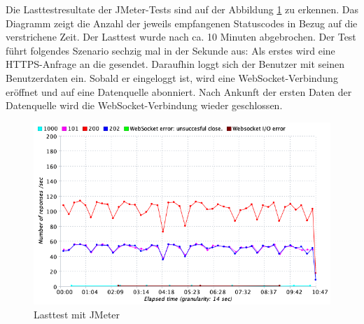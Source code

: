 Die Lasttestresultate der JMeter-Tests sind auf der Abbildung \ref{figure:lasttestmitjmeter}
zu erkennen. Das Diagramm zeigt die Anzahl der jeweils empfangenen Statuscodes in Bezug
auf die verstrichene Zeit. Der Lasttest wurde nach ca. 10 Minuten abgebrochen.
Der Test führt folgendes Szenario sechzig mal in der Sekunde aus:
Als erstes wird eine HTTPS-Anfrage an die  gesendet.
Daraufhin loggt sich der Benutzer mit seinen Benutzerdaten ein.
Sobald er eingeloggt ist, wird eine WebSocket-Verbindung eröffnet
und auf eine Datenquelle abonniert. Nach Ankunft der ersten Daten der
Datenquelle wird die WebSocket-Verbindung wieder geschlossen.

\begin{figure}
    \begin{center}
    \includegraphics[scale=0.4]{img/abbildungen/Lasttest}
    \end{center}
    \caption{Lasttest mit JMeter}
    \label{figure:lasttestmitjmeter}
\end{figure}





